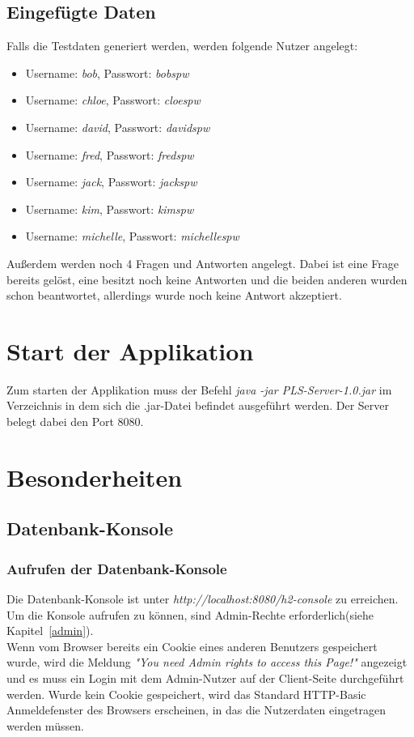 \documentclass[a4paper]{report}
\begin{document}
\section{Eingefügte Daten}
Falls die Testdaten generiert werden, werden folgende Nutzer angelegt:
\begin{itemize}
	\item Username: \textit{bob}, Passwort: \textit{bobspw}
	\item Username: \textit{chloe}, Passwort: \textit{cloespw}
	\item Username: \textit{david}, Passwort: \textit{davidspw}
	\item Username: \textit{fred}, Passwort: \textit{fredspw}
	\item Username: \textit{jack}, Passwort: \textit{jackspw}
	\item Username: \textit{kim}, Passwort: \textit{kimspw}
	\item Username: \textit{michelle}, Passwort: \textit{michellespw}
\end{itemize}
Außerdem werden noch 4 Fragen und Antworten angelegt. Dabei ist eine Frage bereits gelöst, eine besitzt noch keine Antworten und die beiden anderen wurden schon beantwortet, allerdings wurde noch keine Antwort akzeptiert.
\chapter{Start der Applikation}
Zum starten der Applikation muss der Befehl \textit{java -jar PLS-Server-1.0.jar} im Verzeichnis in dem sich die .jar-Datei befindet ausgeführt werden. Der Server belegt dabei den Port 8080.
\chapter{Besonderheiten}
\section{Datenbank-Konsole}
\subsection{Aufrufen der Datenbank-Konsole}
Die Datenbank-Konsole ist unter \textit{http://localhost:8080/h2-console} zu erreichen. Um die Konsole aufrufen zu können, sind Admin-Rechte erforderlich(siehe Kapitel~\ref{admin}).\\ 
Wenn vom Browser bereits ein Cookie eines anderen Benutzers gespeichert wurde, wird die Meldung \textit{"You need Admin rights to access this Page!"} angezeigt und es muss ein Login mit dem Admin-Nutzer auf der Client-Seite durchgeführt werden. Wurde kein Cookie gespeichert, wird das Standard HTTP-Basic Anmeldefenster des Browsers erscheinen, in das die Nutzerdaten eingetragen werden müssen.
\end{document}
